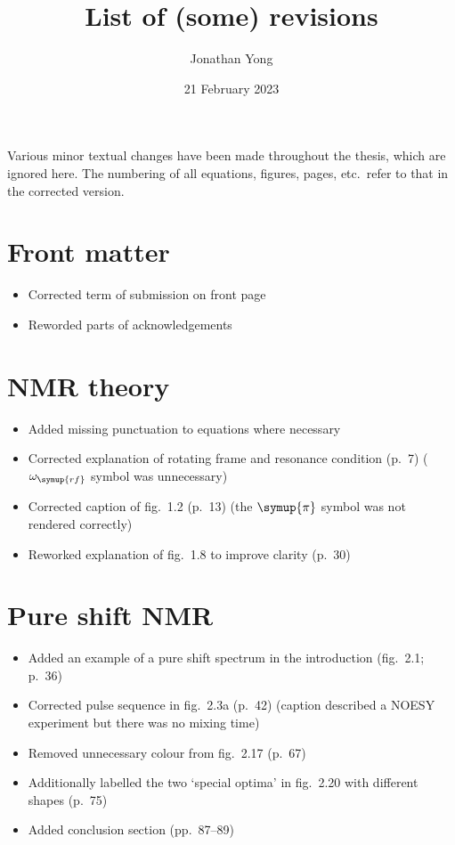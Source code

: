 \documentclass[12pt]{article}
\begin{document}
\title{List of (some) revisions}
\author{Jonathan Yong}
\date{21 February 2023}

\maketitle

Various minor textual changes have been made throughout the thesis, which are ignored here.
The numbering of all equations, figures, pages, etc.\ refer to that in the corrected version.

\section*{Front matter}

\begin{itemize}
    \item Corrected term of submission on front page
    \item Reworded parts of acknowledgements
\end{itemize}

\section{NMR theory}

\begin{itemize}
    \item Added missing punctuation to equations where necessary
    \item Corrected explanation of rotating frame and resonance condition (p.~7) ($\omega_{\symup{rf}}$ symbol was unnecessary)
    \item Corrected caption of fig.~1.2 (p.~13) (the $\symup{\pi}$ symbol was not rendered correctly)
    \item Reworked explanation of fig.~1.8 to improve clarity (p.~30)
\end{itemize}

\section{Pure shift NMR}

\begin{itemize}
    \item Added an example of a pure shift spectrum in the introduction (fig.~2.1; p.~36)
    \item Corrected pulse sequence in fig.~2.3a (p.~42) (caption described a NOESY experiment but there was no mixing time)
    \item Removed unnecessary colour from fig.~2.17 (p.~67)
    \item Additionally labelled the two `special optima' in fig.~2.20 with different shapes (p.~75)
    \item Added conclusion section (pp.~87--89)
\end{itemize}
\end{document}
